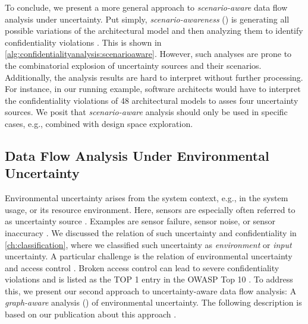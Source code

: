 To conclude, we present a more general approach to \emph{scenario-aware} data flow analysis under uncertainty.
Put simply, \emph{scenario-awareness} () is generating all possible variations of the architectural model and then analyzing them to identify confidentiality violations \cite{walter_architecture-based_2023}.
This is shown in \autoref{alg:confidentialityanalysis:scenarioaware}.
However, such analyses are prone to the combinatorial explosion of uncertainty sources and their scenarios.
Additionally, the analysis results are hard to interpret without further processing.
For instance, in our running example, software architects would have to interpret the confidentiality violations of 48 architectural models to asses four uncertainty sources.
We posit that \emph{scenario-aware} analysis should only be used in specific cases, e.g., combined with design space exploration. 


\subsection{Data Flow Analysis Under Environmental Uncertainty}%
\label{sec:confidentialityanalysis:environmental}

Environmental uncertainty arises from the system context, e.g., in the system usage, or its resource environment.
Here, sensors are especially often referred to as uncertainty source \cite{camara_addressing_2022,camara_uncertainty_2024,perez-palacin_uncertainties_2014,camara_software_2020,weyns_introduction_2020}.
Examples are sensor failure, sensor noise, or sensor inaccuracy \cite{hahner_arcn_2024}.
We discussed the relation of such uncertainty and confidentiality in \autoref{ch:classification}, where we classified such uncertainty as \emph{environment} or \emph{input} uncertainty.
A particular challenge is the relation of environmental uncertainty and access control \cite{bures_capturing_2020,heinrich_dynamic_2023}.
Broken access control can lead to severe confidentiality violations and is listed as the TOP 1 entry in the \ac{OWASP} Top 10 \cite{OWASPTop10}.
To address this, we present our second approach to uncertainty-aware data flow analysis: A \emph{graph-aware} analysis () of environmental uncertainty.
The following description is based on our publication about this approach \cite{boltz_handling_2022}.

